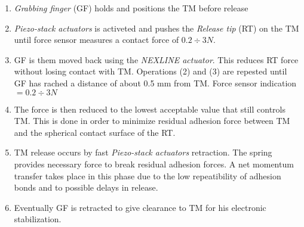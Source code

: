 \documentclass[11pt,twocolumn]{article}
\begin{document}
\begin{enumerate}
\item \textit{Grabbing finger} (GF) holds and positions the TM before release
\item \textit{Piezo-stack actuators} is activeted and pushes the \textit{Release tip} (RT) on the TM until force sensor measures a contact force of $0.2\div 3 N$. 
\item  GF is them moved back using the \textit{NEXLINE actuator}. This reduces RT force without losing contact with TM. Operations (2) and (3) are repested until GF has rached a distance of about 0.5 mm from TM. Force sensor indication$=0.2 \div 3 N$
\item The force is then reduced to the lowest acceptable value that still controls TM. This is done in order to minimize residual adhesion force between TM and the spherical contact surface of the RT.
\item TM release occurs by fast \textit{Piezo-stack actuators} retraction. The spring provides necessary force to break residual adhesion forces. A net momentum transfer takes place in this phase due to the low repeatibility of adhesion bonds and to possible delays in release.
\item Eventually GF is retracted to give clearance to TM for his electronic stabilization.
\end{enumerate}
\end{document}
